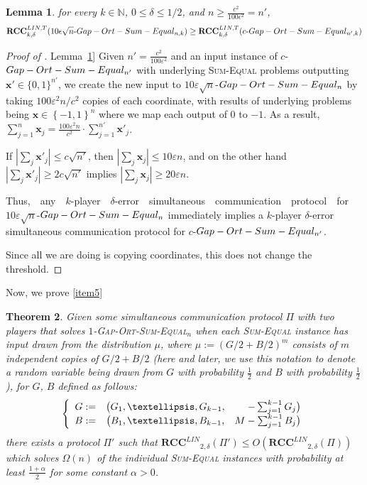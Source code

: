 \documentclass[11pt]{article}
\numberwithin{equation}{section}
\newtheorem{theorem}{Theorem}[section]
\newtheorem{lemma}[theorem]{Lemma}
\theoremstyle{definition}
\theoremstyle{plain}
\newcommand{\expref}[2]{\hyperref[#2]{#1~\ref{#2}}}
\newcommand{\set}[1]{{\left \{{#1} \right \}}}
\newcommand{\zo}{\ensuremath{ \{ 0, 1 \} }}
\newcommand{\error}{\ensuremath{\delta}}
\newcommand{\gap}{\ensuremath{\varepsilon}}
\newcommand{\eqdef}{\ensuremath{:=}}
\newcommand{\rcclin}{\ensuremath{\mathbf{RCC}^{LIN}}}
\newcommand{\rcclinT}{\ensuremath{\mathbf{RCC}^{LIN,T}}}
\newcommand{\sumequal}{\textsc{Sum-Equal} }
\newcommand{\gose}{\textsc{Gap-Ort-Sum-Equal}}
\begin{document}
\begin{lemma}
for every $k \in \mathbb{N}$, $0 \le \delta \le 1/2$, and $n \ge \frac{c^2}{100\epsilon^2}=n'$,
$$\rcclinT_{k,\delta}(10\epsilon\sqrt{n}\text{-}\gose_{n,k}) \ge \rcclinT_{k,\delta}(c\text{-}\gose_{n',k})$$
\label{lemma:gap-ort reduction}
\end{lemma}

\begin{proof}[Proof of \expref{Lemma}{lemma:gap-ort reduction}]
	Given $n'=\frac{c^2}{100\gap^2}$ and 
	an input instance of $c$-$\gose_{n'}$ with underlying \sumequal problems outputting $\mathbf{x}'\in \zo^{n'}$, we create the new input to $10\gap\sqrt{n}$-$\gose_n$ by taking $100\gap^2 n / c^2$ copies of each coordinate, 
	with results of underlying problems being $\mathbf{x}\in\set{-1, 1}^n$ {\color{black}where we map each output of $0$ to $-1$. }
	As a result, $\sum_{j=1}^{n}\mathbf{x}_j  =  \frac{100\gap^2 n}{c^2}\cdot \sum_{j=1}^{n'}\mathbf{x}'_j$.

	If $|\sum_{j}\mathbf{x}'_j| \le c\sqrt{n'}$,
	then $|\sum_{j}\mathbf{x}_j| \le 10\gap n$,
	and on the other hand 
	$|\sum_{j}\mathbf{x}'_j| \ge 2c\sqrt{n'}$
	implies $|\sum_{j}\mathbf{x}_j| \ge 20\gap n$.

%
%
Thus,\ \ any\ \ $k$-player\ \ $\error$-error\ \ simultaneous\ \ 
communication\ \ protocol\ \ for\quad    %
$10\gap\sqrt{n}$-$\gose_n$ immediately implies a $k$-player $\error$-error simultaneous communication protocol for $c$-$\gose_{n'}$.
	 
Since all we are doing is copying coordinates, this does not change the threshold.
\end{proof}

{\color{black} Now, we prove \ref{item5}}  %

\begin{theorem}
Given some simultaneous communication protocol $\Pi$ with two players that solves $1$-\gose$_n$ when each \sumequal instance has input drawn from the distribution $\mu$, {\color{black}where $\mu \eqdef \left(G/2+B/2\right)^m$ consists of $m$ independent copies of $G/2+B/2$ (here and later, we use this notation to denote a random variable being drawn from $G$ with probability $\frac{1}{2}$ and $B$ with probability $\frac{1}{2}$),
	for $G$, $B$ defined as follows:
	$$
		\left\{
		\begin{array}{c c r}
			G \eqdef &	\big( G_1,\dots, G_{k-1} , &-\sum_{j=1}^{k-1} G_j \big)		\\
			B \eqdef &  \big( B_1,\dots, B_{k-1} , &M-\sum_{j=1}^{k-1} B_j \big)
		\end{array}		
		\right.
	$$
}
	there exists a protocol $\Pi'$ such that $\rcclin_{2,\delta}(\Pi') \le O(\rcclin_{2,\delta}(\Pi))$ which solves $\Omega(n)$ of the individual \sumequal instances with probability at least{ \color{black}$\frac{1+\alpha}{2}$ for some constant $\alpha>0$.}
\label{thm:gose complexity}
\end{theorem}
\end{document}
